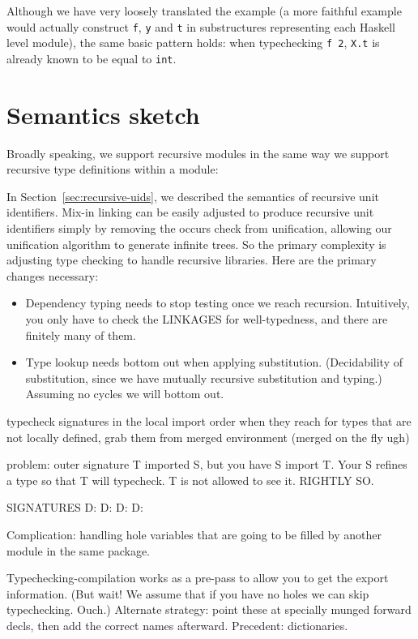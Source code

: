 \noindent
Although we have very loosely translated the example (a more
faithful example would actually construct \verb|f|, \verb|y| and
\verb|t| in substructures representing each Haskell level
module), the same basic pattern holds: when typechecking \verb|f 2|,
\verb|X.t| is already known to be equal to \verb|int|.

\section{Semantics sketch}

Broadly speaking, we support recursive modules in the same way
we support recursive type definitions within a module: 


In Section~\ref{sec:recursive-uids}, we described the semantics of
recursive unit identifiers.  Mix-in linking can be easily adjusted
to produce recursive unit identifiers simply by removing the
occurs check from unification, allowing our unification algorithm
to generate infinite trees.  So the primary complexity is adjusting
type checking to handle recursive libraries.  Here are the primary
changes necessary:

\begin{itemize}
    \item Dependency typing needs to stop testing once we reach
        recursion. Intuitively, you only have to check the
        LINKAGES for well-typedness, and there are finitely
        many of them.
    \item Type lookup needs bottom out when applying substitution.
        (Decidability of substitution, since we have mutually
        recursive substitution and typing.)  Assuming no
        cycles we will bottom out.
\end{itemize}


typecheck signatures in the local import order
    when they reach for types that are not locally defined, grab them
    from merged environment (merged on the fly ugh)

    problem: outer signature T imported S, but you have S import T.
    Your S refines a type so that T will typecheck. T is not allowed
    to see it. RIGHTLY SO.

SIGNATURES D: D: D: D:

Complication: handling hole variables that are going to be filled
by another module in the same package.

Typechecking-compilation works as a pre-pass to allow you to
get the export information.  (But wait! We assume that if you have
no holes we can skip typechecking. Ouch.)  Alternate strategy:
point these at specially munged forward decls, then add the
correct names afterward.  Precedent: dictionaries.

